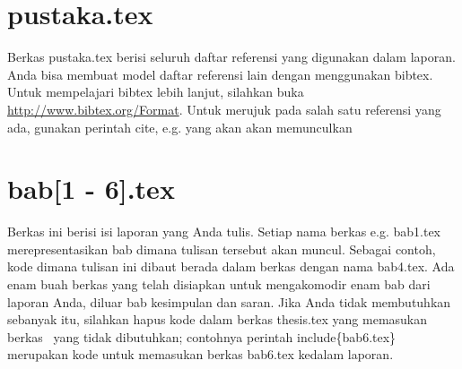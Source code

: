 \section{pustaka.tex}
Berkas pustaka.tex berisi seluruh daftar referensi yang digunakan dalam 
laporan. 
Anda bisa membuat model daftar referensi lain dengan menggunakan bibtex.
Untuk mempelajari bibtex lebih lanjut, silahkan buka 
\url{http://www.bibtex.org/Format}. 
Untuk merujuk pada salah satu referensi yang ada, gunakan perintah \bslash 
cite, e.g. \bslash  yang akan akan memunculkan 
\citep{babu2004introduction}


\section{bab[1 - 6].tex}
Berkas ini berisi isi laporan yang Anda tulis. 
Setiap nama berkas e.g. bab1.tex merepresentasikan bab dimana tulisan tersebut 
akan muncul. 
Sebagai contoh, kode dimana tulisan ini dibaut berada dalam berkas dengan nama 
bab4.tex. 
Ada enam buah berkas yang telah disiapkan untuk mengakomodir enam bab dari 
laporan Anda, diluar bab kesimpulan dan saran. 
Jika Anda tidak membutuhkan sebanyak itu, silahkan hapus kode dalam berkas 
thesis.tex yang memasukan berkas \latex~yang tidak dibutuhkan;  contohnya 
perintah \bslash include\{bab6.tex\} merupakan kode untuk memasukan berkas 
bab6.tex kedalam laporan.

